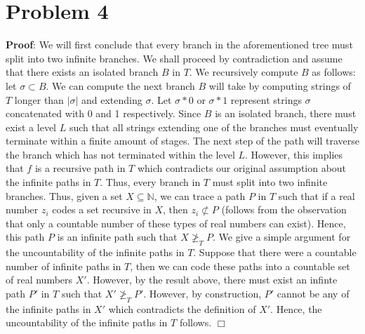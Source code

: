 \documentclass[11pt]{article}
\def\endproofmark{$\Box$}
\newenvironment{proof}{\par{\bf Proof}:}{\endproofmark\smallskip}
\begin{document}
\section*{Problem 4}
\begin{proof}
 We will first conclude that every branch in the aforementioned tree must split into two infinite branches. We shall proceed by contradiction and assume that there exists an isolated branch $B$ in $T$. We recursively compute $B$ as follows: let 
 $\sigma \subset B$. We can compute the next branch $B$ will take by computing strings of $T$ longer than $|\sigma|$ and extending $\sigma$. Let $\sigma*0$ or $\sigma*1$ represent strings $\sigma$ concatenated with 0 and 1 respectively. Since $B$ is an isolated branch, there must exist a level $L$ such that all strings extending one of the branches must eventually terminate within a finite amount of stages. The next step of the path will traverse the branch which has not terminated within the level $L$. 
 However, this implies that $f$ is a recursive path in $T$ which contradicts our original assumption about the infinite paths in $T$. Thus, every branch in $T$ must split into two infinite branches. Thus, given a set $X \subseteq \mathbb{N}$, we can trace a path $P$ in $T$ such that if a real number $z_i$ codes a set recursive in $X$, then $z_i \not\subset P$ (follows from the observation that only a countable number of these types of real numbers can exist). Hence, this path $P$ is an infinite path such that $X \not\geq_T P$. We give a simple argument for the uncountability of the infinite paths in $T$. Suppose that there were a countable number of infinite paths in $T$, then we can code these paths into a countable set of real numbers $X'$.
 However, by the result above, there must exist an infinte path $P'$ in $T$ such that $X' \not\geq_T P'$. However, by construction, $P'$ cannot be any of the infinite paths in $X'$ which contradicts the definition of $X'$. Hence, the uncountability of the infinite paths in $T$ follows.
\end{proof}
\end{document}

